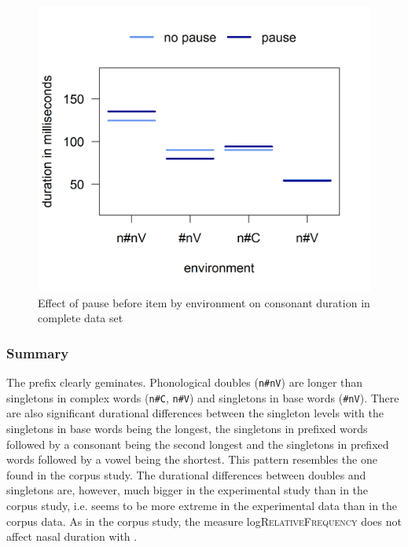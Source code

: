 					\begin{figure}
	
	\includegraphics [scale=0.5] {images/Experiment/unModelCompleteInterEnvPause}
	\caption{Effect of pause before item by environment on consonant duration in complete data set}
	\label{fig:NumNasal Pauseun experiment}
\end{figure}
%



\subsubsection{Summary}


The prefix  clearly geminates. Phonological doubles (\texttt{n\#nV})  are longer than singletons in complex words (\texttt{n\#C}, \texttt{n\#V}) and singletons in base words (\texttt{\#nV}). There are also significant durational differences between the singleton levels with the singletons in base words being the longest, the singletons in prefixed words followed by a consonant being the second longest and the singletons in prefixed words followed by a vowel being the shortest. This pattern resembles the one found in the corpus study. The durational differences between doubles and singletons are, however, much bigger in the experimental study than in the corpus study, i.e.  seems to be more extreme in the experimental data than in the corpus data. 
As in the corpus study, the  measure log\textsc{RelativeFrequency} does not affect nasal duration with .


